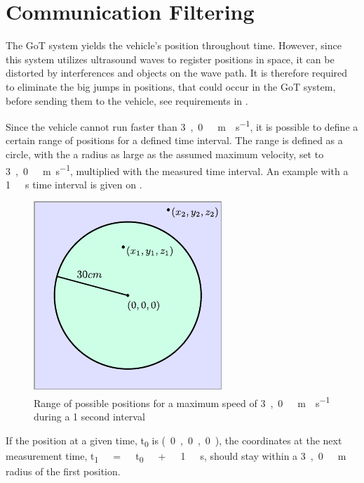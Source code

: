 \section{Communication Filtering}
The GoT system yields the vehicle's position throughout time. However, since this system utilizes ultrasound waves to register positions in space, it can be distorted by interferences and objects on the wave path. It is therefore required to eliminate the big jumps in positions, that could occur in the GoT system, before sending them to the vehicle, see requirements in .

Since the vehicle cannot run faster than \si{3,0\ m \cdot s^{-1}}, it is possible to define a certain range of positions for a defined time interval. The range is defined as a circle, with the a radius as large as the assumed maximum velocity, set to \si{3,0\ m.s^{-1}}, multiplied with the measured time interval. An example with a \si{1\ s} time interval is given on .
%
\begin{figure}[H]
  \centering
  \includegraphics[scale=1.3]{figures/GoTFilterSimple.pdf}
  \caption{Range of possible positions for a maximum speed of \si{3,0\ m \cdot s^{-1}} during a 1 second interval}
  \label{GoTFilterSimple}
\end{figure}
%
If the position at a given time, \si{t_0} is \si{(0,0,0)}, the coordinates at the next measurement time, \si{t_1\ =\ t_0\ +\ 1\ s}, should stay within a \si{3,0\ m} radius of the first position.

